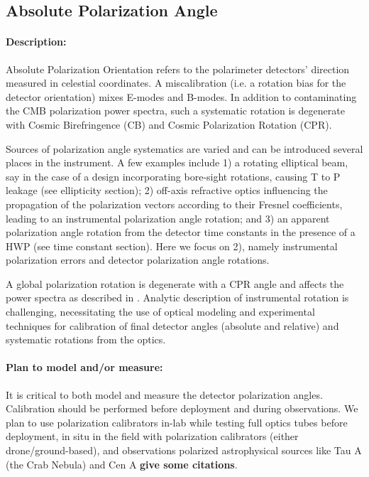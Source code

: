 \subsection{Absolute Polarization Angle}

\paragraph{Description:}
Absolute Polarization Orientation refers to the polarimeter detectors' direction measured in celestial coordinates. A miscalibration (i.e. a rotation bias for the detector orientation) mixes E-modes and B-modes. In addition to contaminating the CMB polarization power spectra, such a systematic rotation is degenerate with Cosmic Birefringence (CB) and Cosmic Polarization Rotation (CPR).

Sources of polarization angle systematics are varied and can be introduced
several places in the instrument. A few examples include 1) a rotating elliptical beam, say
in the case of a design incorporating bore-sight rotations, causing T to P leakage (see ellipticity section); 2) off-axis refractive optics influencing the propagation of the polarization vectors according to their Fresnel coefficients, leading to an instrumental polarization angle rotation; and 3) an apparent polarization angle rotation from the detector time constants in the presence of a HWP (see time constant section). Here we focus on 2), namely instrumental polarization errors and
detector polarization angle rotations.

A global polarization rotation is degenerate with a CPR angle and affects the
power spectra as described in \cite{2013ApJ...762L..23K}. Analytic description
of instrumental rotation is challenging, necessitating the use of optical
modeling and experimental techniques for calibration of final detector angles
(absolute and relative) and systematic rotations from the optics.

\paragraph{Plan to model and/or measure:}

It is critical to both model and measure the detector polarization angles.
Calibration should be performed before deployment and during observations. 
We plan to use polarization calibrators in-lab while testing full optics tubes before deployment, in situ in the field with polarization calibrators (either drone/ground-based), and observations polarized astrophysical sources like Tau A (the Crab
Nebula) and Cen A \textbf{give some citations}.

